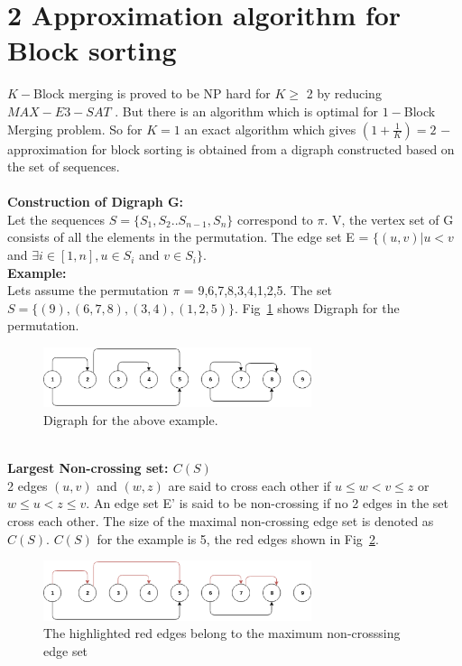 \documentclass[BTech]{iitmdiss}
\begin{document}
\section{2 Approximation algorithm for Block sorting}
$K-$Block merging is proved to be NP hard for $K \geq$ 2 by reducing $MAX-E3-SAT$ \citep{narayanaswamy2015block}. But there is an algorithm which is optimal for $1-$Block Merging problem. So for $K = 1$ an exact algorithm which gives $(1+\frac{1}{K}) = 2$ $-$ approximation for block sorting is obtained from a digraph constructed based on the set of sequences.\\~\\
\noindent
\textbf{Construction of Digraph G:}\\
Let the sequences $S = \{S_1,S_2 .. S_{n-1},S_n\}$ correspond to $\pi$. V, the vertex set of G consists of all the elements in the permutation. The edge set E  = $\{(u,v)| u<v$ and $\exists i\in [1,n], u \in S_i$ and $v \in S_i \}$.\\
\textbf{Example:}\\
Lets assume the permutation $\pi$ = 9,6,7,8,3,4,1,2,5. The set $S = \{(9),(6,7,8),(3,4),(1,2,5)\}$. Fig~\ref{fig:digraph} shows Digraph for the permutation. 
\begin{figure}[htpb]
  \begin{center}
  \includegraphics[width=0.7\textwidth]{digraph1.eps}
    \caption {Digraph for the above example.}
  \label{fig:digraph}
  \end{center}
\end{figure}
\\
\noindent
\textbf{Largest Non-crossing set: $C(S)$}\\
2 edges $(u,v)$ and $(w,z)$ are said to cross each other if $u\leq w < v \leq z$ or $w\leq u < z \leq v$. An edge set E' is said to be non-crossing if no 2 edges in the set cross each other. The size of the maximal non-crossing edge set is denoted as $C(S).$ $C(S)$ for the example is 5, the red edges shown in Fig~\ref{fig:digraphred}.
\begin{figure}[htpb]
  \begin{center}
  \includegraphics[width=0.7\textwidth]{digraph2.eps}
    \caption {The highlighted red edges belong to the maximum non-crosssing edge set}
  \label{fig:digraphred}
  \end{center}
\end{figure}
\end{document}
